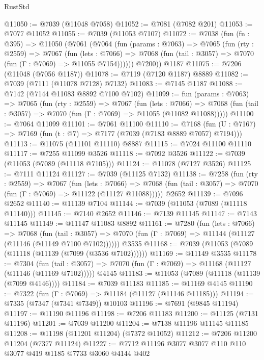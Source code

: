 \begin{lexlean}{RustStd}
\begin{coremodule}
@11050 := @7039 (@11048 @7058)
@11052 := @7081 (@7082 @201)
@11053 := @7077 @11052
@11055 := @7039 (@11053 @7107)
@11072 := @7038
    (fun (fn : @395) =>
    @11050
      (@7061
        (@7064
          (fun (params : @7063) =>
          @7065
            (fun (rty : @2559) =>
            @7067
              (fun (lets : @7066) =>
              @7068 (fun (tail : @3057) => @7070 (fun (Γ : @7069) => @11055 @7154))))))
        @7200))
    @1187
@11075 := @7206 (@11048 (@7056 @1187))
@11078 := @7119 (@7120 @1187) @8889
@11082 := @7039 (@7111 (@11078 @7128) @7132)
@11083 := @7145 @1187
@11088 := @7142 (@7144 @11083 @8892 @7100 @7102)
@11099 := fun (params : @7063) =>
  @7065
    (fun (rty : @2559) =>
    @7067
      (fun (lets : @7066) =>
      @7068 (fun (tail : @3057) => @7070 (fun (Γ : @7069) => @11055 (@11082 @11088)))))
@11100 := @7064 @11099
@11101 := @7061 @11100
@11110 := @7168 (fun (U : @7167) => @7169 (fun (t : @7) => @7177 (@7039 (@7183 @8889 @7057) @7194)))
@11113 := @11075 (@11101 @11110) @8887
@11115 := @7024 @11100 @11110
@11117 := @7255 @11099 @3526
@11118 := @7092 @3526
@11122 := @7039 (@11053 (@7089 (@11118 @7105)))
@11124 := @11078 (@7127 @3526)
@11125 := @7111 @11124
@11127 := @7039 (@11125 @7132)
@11138 := @7258
    (fun (rty : @2559) =>
    @7067
      (fun (lets : @7066) =>
      @7068 (fun (tail : @3057) => @7070 (fun (Γ : @7069) => @11122 (@11127 @11088)))))
    @2652
@11139 := @7096 @2652
@11140 := @11139 @7104
@11144 := @7039 (@11053 (@7089 (@11118 @11140)))
@11145 := @7140 @2652
@11146 := @7139 @11145
@11147 := @7143 @11145
@11149 := @11147 @11083 @8892
@11161 := @7280
    (fun (lets : @7066) =>
    @7068
      (fun (tail : @3057) =>
      @7070 (fun (Γ : @7069) => @11144 (@11127 (@11146 (@11149 @7100 @7102))))))
    @3535
@11168 := @7039 (@11053 (@7089 (@11118 (@11139 (@7099 (@3536 @7102))))))
@11169 := @11149 @3535
@11178 := @7304
    (fun (tail : @3057) => @7070 (fun (Γ : @7069) => @11168 (@11127 (@11146 (@11169 @7102)))))
    @4145
@11183 := @11053 (@7089 (@11118 (@11139 (@7099 @4146))))
@11184 := @7039 @11183
@11185 := @11169 @4145
@11190 := @7322 (fun (Γ : @7069) => @11184 (@11127 (@11146 @11185)))
@11194 := @7335 (@7347 (@7341 @7349)) @10103
@11196 := @7691 (@9845 @11194)
@11197 := @11190 @11196
@11198 := @7206 @11183
@11200 := @11125 (@7131 @11196)
@11201 := @7039 @11200
@11204 := @7138 @11196 @11145 @11185
@11208 := @11198 (@11201 @11204) (@7372 @11052)
@11212 := @7206 @11200 @11204 (@7377 @11124)
@11227 := @7712
    @11196
    @3077
    @3077
    @110
    @110
    @3077
    @419
    @1185
    @7733
    @3060
    @4144
    @402

\end{coremodule}
\end{lexlean}
